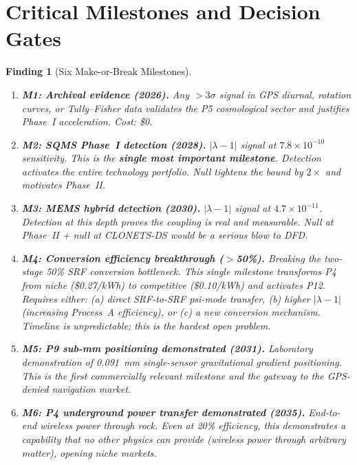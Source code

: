 \documentclass[11pt]{article}
\newtheorem{finding}{Finding}
\newcommand{\ee}[1]{\times 10^{#1}}
\newcommand{\lambdaone}{|\lambda{-}1|}
\begin{document}
\section{Critical Milestones and Decision Gates}
\label{sec:milestones}

\begin{finding}[Six Make-or-Break Milestones]
\label{find:milestones}
\begin{enumerate}
\item \textbf{M1: Archival evidence (2026).} Any $>3\sigma$ signal in
  GPS diurnal, rotation curves, or Tully--Fisher data validates the P5
  cosmological sector and justifies Phase~I acceleration. Cost: \$0.

\item \textbf{M2: SQMS Phase~I detection (2028).} $\lambdaone$ signal
  at $7.8\ee{-10}$ sensitivity. This is the \textbf{single most important
  milestone}. Detection activates the entire technology portfolio. Null
  tightens the bound by $2\times$ and motivates Phase~II.

\item \textbf{M3: MEMS hybrid detection (2030).} $\lambdaone$ signal at
  $4.7\ee{-11}$. Detection at this depth proves the coupling is real and
  measurable. Null at Phase~II + null at CLONETS-DS would be a serious
  blow to DFD.

\item \textbf{M4: Conversion efficiency breakthrough ($>$50\%).}
  Breaking the two-stage 50\% SRF conversion bottleneck. This single
  milestone transforms P4 from niche (\$0.27/kWh) to competitive
  (\$0.10/kWh) and activates P12. Requires either: (a) direct
  SRF-to-SRF psi-mode transfer, (b) higher $\lambdaone$ (increasing
  Process~A efficiency), or (c) a new conversion mechanism. Timeline
  is unpredictable; this is the hardest open problem.

\item \textbf{M5: P9 sub-mm positioning demonstrated (2031).}
  Laboratory demonstration of 0.091~mm single-sensor gravitational
  gradient positioning. This is the first commercially relevant
  milestone and the gateway to the GPS-denied navigation market.

\item \textbf{M6: P4 underground power transfer demonstrated (2035).}
  End-to-end wireless power through rock. Even at 20\% efficiency,
  this demonstrates a capability that no other physics can provide
  (wireless power through arbitrary matter), opening niche markets.
\end{enumerate}
\end{finding}
\end{document}
